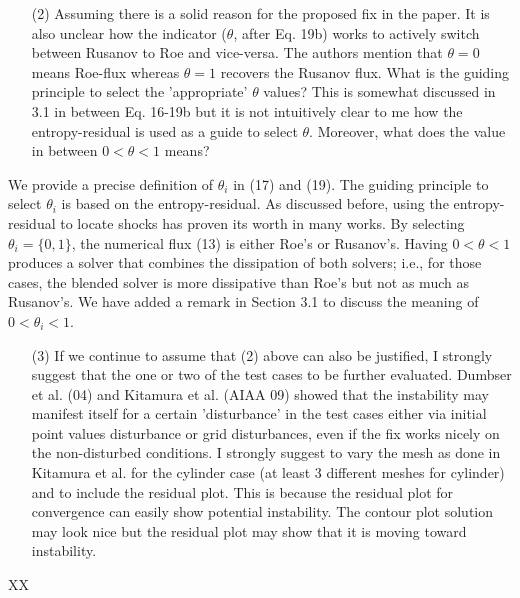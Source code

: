 \documentclass[english,11pt]{article}
\begin{document}
\bigskip
{\color{red}
  \begin{itemize}
  \item[(2)]
    Assuming there is a solid reason for the proposed fix in the paper. It is also unclear how the indicator
    ($\theta$, after Eq. 19b) works to actively switch between Rusanov to Roe and vice-versa. The authors
    mention that $\theta=0$ means Roe-flux whereas $\theta=1$ recovers the Rusanov flux. What is the guiding
    principle to select the 'appropriate' $\theta$ values? This is somewhat discussed in 3.1 in between Eq. 
    16-19b but it is not intuitively clear to me how the entropy-residual is used as a guide to select $\theta$.
    Moreover, what does the value in between $0<\theta<1$ means?
  \end{itemize}
}
\noindent
We provide a precise definition of $\theta_i$ in (17) and (19). The guiding principle to select $\theta_i$
is based on the entropy-residual. As discussed before, using the entropy-residual to locate shocks has proven
its worth in many works. 
By selecting $\theta_i=\{0,1\}$, the numerical flux (13) is either Roe's or Rusanov's.
Having $0<\theta<1$ produces a solver that combines the dissipation of both solvers; i.e.,
for those cases, the blended solver is more dissipative than Roe's but not as much as Rusanov's. 
We have added a remark in Section 3.1 to discuss the meaning of $0<\theta_i<1$.

\bigskip
{\color{red}
  \begin{itemize}
  \item[(3)]
    If we continue to assume that (2) above can also be justified, I strongly suggest that the one or two of
    the test cases to be further evaluated. Dumbser et al. (04) and Kitamura et al. (AIAA 09) showed that the
    instability may manifest itself for a certain 'disturbance' in the test cases either via initial point values
    disturbance or grid disturbances, even if the fix works nicely on the non-disturbed conditions. I strongly
    suggest to vary the mesh as done in Kitamura et al. for the cylinder case (at least 3 different meshes for
    cylinder) and to include the residual plot. This is because the residual plot for convergence can easily show
    potential instability. The contour plot solution may look nice but the residual plot may show that it is
    moving toward instability.
  \end{itemize}
}
\noindent
XX
\end{document}
